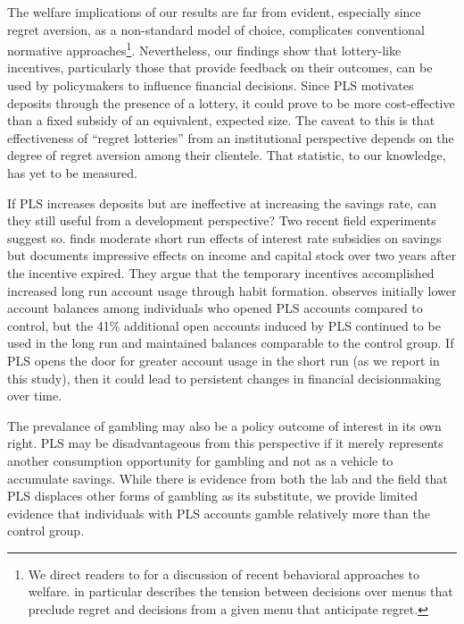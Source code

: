 \documentclass[12pt, titlepage]{article}
\begin{document}
	The welfare implications of our results are far from evident, especially since regret aversion, as a non-standard model of choice, complicates conventional normative approaches\footnote{We direct readers to \textcite{bernheim_behavioral_2009} for a discussion of recent behavioral approaches to welfare. \textcite{sarver_anticipating_2008} in particular describes the tension between decisions over menus that preclude regret and decisions from a given menu that anticipate regret.}. Nevertheless, our findings show that lottery-like incentives, particularly those that provide feedback on their outcomes, can be used by policymakers to influence financial decisions. Since PLS motivates deposits through the presence of a lottery, it could prove to be more cost-effective than a fixed subsidy of an equivalent, expected size. The caveat to this is that effectiveness of ``regret lotteries'' from an institutional perspective depends on the degree of regret aversion among their clientele. That statistic, to our knowledge, has yet to be measured.

	If PLS increases deposits but are ineffective at increasing the savings rate, can they still useful from a development perspective? Two recent field experiments suggest so. \textcite{schaner_persistent_2018} finds moderate short run effects of interest rate subsidies on savings but documents impressive effects on income and capital stock over two years after the incentive expired. They argue that the temporary incentives accomplished increased long run account usage through habit formation. \textcite{gertler_long-term_2017} observes initially lower account balances among individuals who opened PLS accounts compared to control, but the 41\% additional open accounts induced by PLS continued to be used in the long run and maintained balances comparable to the control group. If PLS opens the door for greater account usage in the short run (as we report in this study), then it could lead to persistent changes in financial decisionmaking over time.

	The prevalance of gambling may also be a policy outcome of interest in its own right. PLS may be disadvantageous from this perspective if it merely represents another consumption opportunity for gambling and not as a vehicle to accumulate savings. While there is evidence from both the lab and the field that PLS displaces other forms of gambling as its substitute, we provide limited evidence that individuals with PLS accounts gamble relatively more than the control group. 
\end{document}
